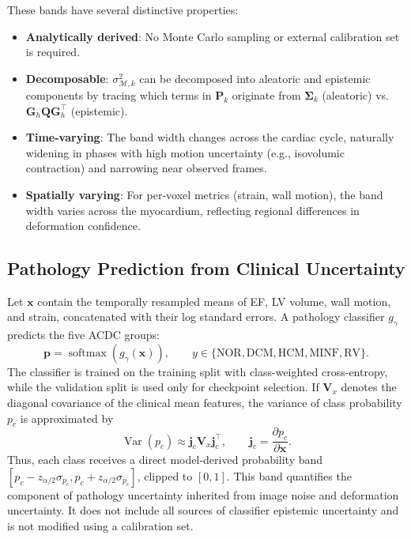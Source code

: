 \documentclass[10pt,twocolumn]{article}
\begin{document}
These bands have several distinctive properties:
\begin{itemize}
    \item \textbf{Analytically derived}: No Monte Carlo sampling or external calibration set is required.
    \item \textbf{Decomposable}: $\sigma^2_{\mathcal{M},k}$ can be decomposed into aleatoric and epistemic components by tracing which terms in $\bm{P}_k$ originate from $\bm{\Sigma}_k$ (aleatoric) vs.\ $\bm{G}_h\bm{Q}\bm{G}_h^\top$ (epistemic).
    \item \textbf{Time-varying}: The band width changes across the cardiac cycle, naturally widening in phases with high motion uncertainty (e.g., isovolumic contraction) and narrowing near observed frames.
    \item \textbf{Spatially varying}: For per-voxel metrics (strain, wall motion), the band width varies across the myocardium, reflecting regional differences in deformation confidence.
\end{itemize}

\subsection{Pathology Prediction from Clinical Uncertainty}

Let $\bm{x}$ contain the temporally resampled means of EF, LV volume, wall
motion, and strain, concatenated with their log standard errors. A pathology
classifier $g_\gamma$ predicts the five ACDC groups:
\begin{equation}
    \bm{p}=\operatorname{softmax}(g_\gamma(\bm{x})),
    \qquad
    y\in\{\mathrm{NOR},\mathrm{DCM},\mathrm{HCM},\mathrm{MINF},\mathrm{RV}\}.
    \label{eq:pathology_probability}
\end{equation}
The classifier is trained on the training split with class-weighted
cross-entropy, while the validation split is used only for checkpoint
selection. If $\bm{V}_{x}$ denotes the diagonal covariance of the clinical mean
features, the variance of class probability $p_c$ is approximated by
\begin{equation}
    \operatorname{Var}(p_c)
    \approx
    \bm{j}_c\bm{V}_{x}\bm{j}_c^\top,
    \qquad
    \bm{j}_c=\frac{\partial p_c}{\partial \bm{x}}.
    \label{eq:pathology_variance}
\end{equation}
Thus, each class receives a direct model-derived probability band
$[p_c-z_{\alpha/2}\sigma_{p_c},p_c+z_{\alpha/2}\sigma_{p_c}]$, clipped to
$[0,1]$. This band quantifies the component of pathology uncertainty inherited
from image noise and deformation uncertainty. It does not include all sources
of classifier epistemic uncertainty and is not modified using a calibration
set.
\end{document}
